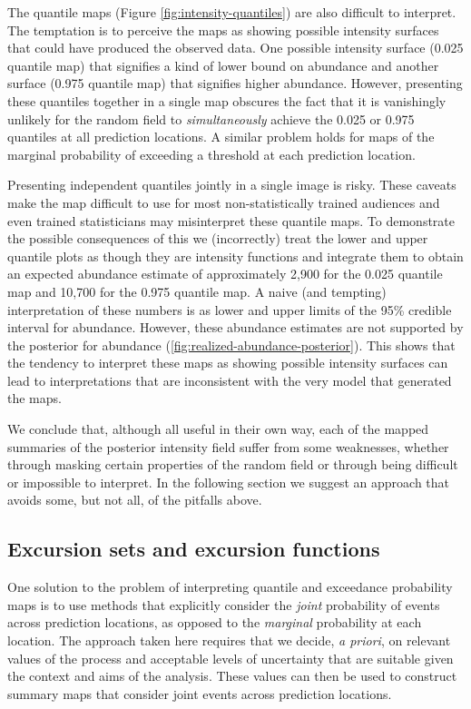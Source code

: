 \documentclass{statsoc}
\begin{document}
The quantile maps (Figure \ref{fig:intensity-quantiles}) are also difficult to interpret. The temptation is to perceive the maps as showing possible intensity surfaces that could have produced the observed data. One possible intensity surface (0.025 quantile map) that signifies a kind of lower bound on abundance and another surface (0.975 quantile map) that signifies higher abundance.  However, presenting these quantiles together in a single map obscures the fact that it is vanishingly unlikely for the random field to \textit{simultaneously} achieve the 0.025 or 0.975 quantiles at all prediction locations.  A similar problem holds for maps of the marginal probability of exceeding a threshold at each prediction location.  

Presenting independent quantiles jointly in a single image is risky.  These caveats make the map difficult to use for most non-statistically trained audiences and even trained statisticians may misinterpret these quantile maps.  To demonstrate the possible consequences of this we (incorrectly) treat the lower and upper quantile plots as though they are intensity functions and integrate them to obtain an expected abundance estimate of approximately 2,900 for the 0.025 quantile map and 10,700 for the 0.975 quantile map.  A naive (and tempting) interpretation of these numbers is as lower and upper limits of the 95\% credible interval for abundance. However, these abundance estimates are not supported by the posterior for abundance (\autoref{fig:realized-abundance-posterior}).  This shows that the tendency to interpret these maps as showing possible intensity surfaces can lead to interpretations that are inconsistent with the very model that generated the maps.

We conclude that, although all useful in their own way, each of the mapped summaries of the posterior intensity field suffer from some weaknesses, whether through masking certain properties of the random field or through being difficult or impossible to interpret. In the following section we suggest an approach that avoids some, but not all, of the pitfalls above.

\subsection{Excursion sets and excursion functions}

One solution to the problem of interpreting quantile and exceedance probability maps is to use methods that explicitly consider the \textit{joint} probability of events across prediction locations, as opposed to the \textit{marginal} probability at each location. The approach taken here requires that we decide, \emph{a priori}, on relevant values of the process and acceptable levels of uncertainty that are suitable given the context and aims of the analysis.  These values can then be used to construct summary maps that consider joint events across prediction locations.  
\end{document}
